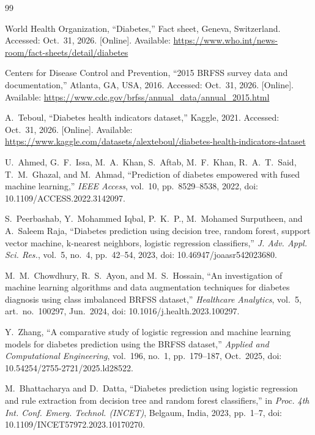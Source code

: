 \documentclass[conference]{IEEEtran}
\begin{document}

\begin{thebibliography}{99}

World Health Organization, ``Diabetes,'' Fact sheet, Geneva, Switzerland. Accessed: Oct.~31, 2026. [Online]. Available: \url{https://www.who.int/news-room/fact-sheets/detail/diabetes}

Centers for Disease Control and Prevention, ``2015 BRFSS survey data and documentation,'' Atlanta, GA, USA, 2016. Accessed: Oct.~31, 2026. [Online]. Available: \url{https://www.cdc.gov/brfss/annual_data/annual_2015.html}

A.~Teboul, ``Diabetes health indicators dataset,'' Kaggle, 2021. Accessed: Oct.~31, 2026. [Online]. Available: \url{https://www.kaggle.com/datasets/alexteboul/diabetes-health-indicators-dataset}

U.~Ahmed, G.~F.~Issa, M.~A.~Khan, S.~Aftab, M.~F.~Khan, R.~A.~T.~Said, T.~M.~Ghazal, and M.~Ahmad, ``Prediction of diabetes empowered with fused machine learning,'' \textit{IEEE Access}, vol.~10, pp.~8529--8538, 2022, doi: 10.1109/ACCESS.2022.3142097.

S.~Peerbashab, Y.~Mohammed Iqbal, P.~K.~P., M.~Mohamed Surputheen, and A.~Saleem Raja, ``Diabetes prediction using decision tree, random forest, support vector machine, k-nearest neighbors, logistic regression classifiers,'' \textit{J. Adv. Appl. Sci. Res.}, vol.~5, no.~4, pp.~42--54, 2023, doi: 10.46947/joaasr542023680.

M.~M.~Chowdhury, R.~S.~Ayon, and M.~S.~Hossain, ``An investigation of machine learning algorithms and data augmentation techniques for diabetes diagnosis using class imbalanced BRFSS dataset,'' \textit{Healthcare Analytics}, vol.~5, art.~no.~100297, Jun.~2024, doi: 10.1016/j.health.2023.100297.

Y.~Zhang, ``A comparative study of logistic regression and machine learning models for diabetes prediction using the BRFSS dataset,'' \textit{Applied and Computational Engineering}, vol.~196, no.~1, pp.~179--187, Oct.~2025, doi: 10.54254/2755-2721/2025.ld28522.

M.~Bhattacharya and D.~Datta, ``Diabetes prediction using logistic regression and rule extraction from decision tree and random forest classifiers,'' in \textit{Proc. 4th Int. Conf. Emerg. Technol. (INCET)}, Belgaum, India, 2023, pp.~1--7, doi: 10.1109/INCET57972.2023.10170270.


\end{thebibliography}
\end{document}
